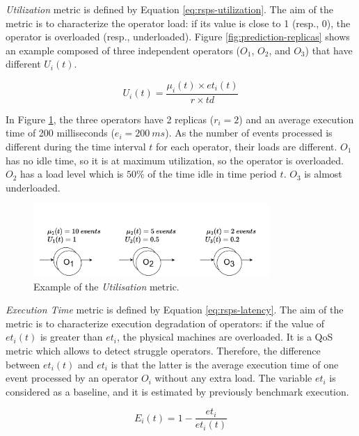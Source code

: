 \textit{Utilization} metric  is defined by Equation \ref{eq:rsps-utilization}. The aim of the metric is to characterize the operator load: if its value is close to 1 (resp., 0), the operator is overloaded (resp., underloaded). Figure \ref{fig:prediction-replicas} shows an example composed of three independent operators ($O_1$, $O_2$, and $O_3$) that have different $U_i(t)$.

\begin{equation}
\label{eq:rsps-utilization}
        U_i(t) = \frac{\mu_i(t) \times et_i(t)}{r \times td}
\end{equation}

In Figure \ref{fig:rsps-metric-u}, the three operators have 2 replicas ($r_i=2$) and an average execution time of 200 milliseconds ($e_i=200~ms$). As the number of events processed is different during the time interval $t$ for each operator, their loads are different. $O_1$ has no idle time, so it is at maximum utilization, so the operator is overloaded. $O_2$ has a load level which is $50\%$ of the time idle in time period $t$. $O_3$ is almost underloaded.

\begin{figure}[!ht]
    \centering
    \includegraphics[width=0.8\textwidth]{figures/concepts/RA-SPS-Metric-U.pdf}
    \caption{Example of the \textit{Utilisation} metric.}
    \label{fig:rsps-metric-u}
\end{figure}


\textit{Execution Time} metric  is defined by Equation \ref{eq:rsps-latency}. The aim of the metric is to characterize execution degradation of operators: if the value of $et_i(t)$ is greater than $et_i$, the physical machines are overloaded. It is a QoS metric which allows to detect struggle operators. Therefore, the difference between $et_i(t)$ and $et_i$ is that the latter is the average execution time of one event processed by an operator $O_i$ without any extra load. The variable $et_i$ is considered as a baseline, and it is estimated by previously  benchmark execution.

\begin{equation}       
        E_i(t) = 1-\frac{et_i}{et_i(t)}
\label{eq:rsps-latency}
\end{equation}


